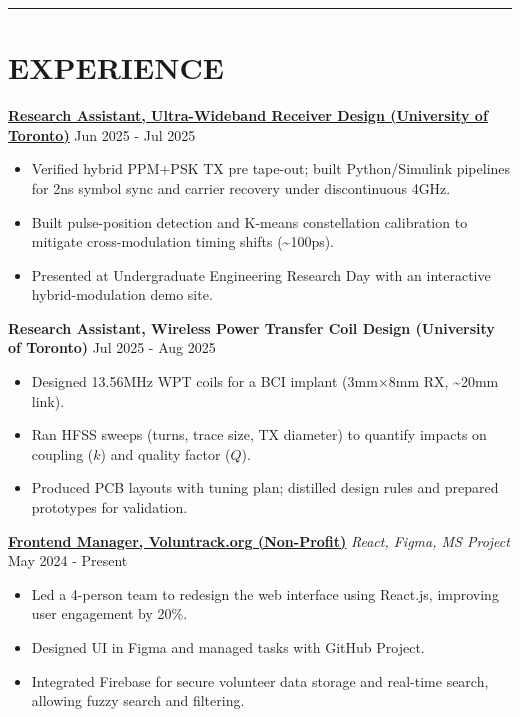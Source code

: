 \documentclass[a4paper,10pt]{article}
\begin{document}
\noindent\rule{\linewidth}{1pt}

\section*{\textbf{EXPERIENCE}}

\noindent\href{https://github.com/Ken-2511/ppm-psk-visualize}{\uline{\textbf{Research Assistant, Ultra-Wideband Receiver Design (University of Toronto)}}} \hfill Jun 2025 - Jul 2025
\begin{itemize}[leftmargin=0.2in]
    \item Verified hybrid PPM+PSK TX pre tape-out; built Python/Simulink pipelines for 2ns symbol sync and carrier recovery under discontinuous 4GHz.
    \item Built pulse-position detection and K-means constellation calibration to mitigate cross-modulation timing shifts (\textasciitilde100ps).
    \item Presented at Undergraduate Engineering Research Day with an interactive hybrid-modulation demo site.
\end{itemize}

\vspace{0.3cm}
\noindent\textbf{Research Assistant, Wireless Power Transfer Coil Design (University of Toronto)} \hfill Jul 2025 - Aug 2025
\begin{itemize}[leftmargin=0.2in]
    \item Designed 13.56MHz WPT coils for a BCI implant (3mm×8mm RX, \textasciitilde20mm link).
    \item Ran HFSS sweeps (turns, trace size, TX diameter) to quantify impacts on coupling ($k$) and quality factor ($Q$).
    \item Produced PCB layouts with tuning plan; distilled design rules and prepared prototypes for validation.
\end{itemize}


\vspace{0.3cm}
\noindent\href{https://github.com/VolunTrack/Web}{\uline{
\textbf{Frontend Manager, Voluntrack.org (Non-Profit)}}} \textbar{} \textit{React, Figma, MS Project} \hfill May 2024 - Present
\begin{itemize}[leftmargin=0.2in]
    \item Led a 4-person team to redesign the web interface using React.js, improving user engagement by 20\%.
    \item Designed UI in Figma and managed tasks with GitHub Project.
    \item Integrated Firebase for secure volunteer data storage and real-time search, allowing fuzzy search and filtering.
\end{itemize}
\end{document}

